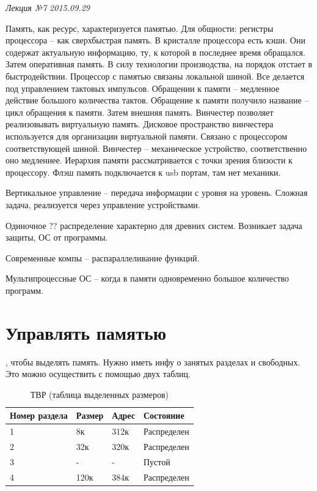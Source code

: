 \clearpage
\begin{flushright}
	\textit{Лекция №7}
	\textit{2015.09.29}
\end{flushright}

Память, как ресурс, характеризуется памятью. Для общности: регистры процессора – как сверхбыстрая память. В кристалле процессора есть кэши. Они содержат актуальную информацию, ту, к которой в последнее время обращался. Затем оперативная память. В силу технологии производства, на порядок отстает в быстродействии. Процессор с памятью связаны локальной шиной. Все делается под управлением тактовых импульсов. Обращении к памяти – медленное действие большого количества тактов. Обращение к памяти получило название – цикл обращения к памяти. Затем внешняя память. Винчестер позволяет реализовывать виртуальную память. Дисковое пространство винчестера используется для организации виртуальной памяти. Связано с процессором соответствующей шиной. Винчестер – механическое устройство, соответственно оно медленнее. Иерархия памяти рассматривается с точки зрения близости к процессору. Флэш память подключается к usb портам, там нет механики. 

Вертикальное управление – передача информации с уровня на уровень. Сложная задача, реализуется через управление устройствами.

Одиночное ?? распределение характерно для древних систем. Возникает задача защиты, ОС от программы.

Современные компы – распараллеливание функций.

Мультипроцессные ОС – когда в памяти одновременно большое количество программ.

\section{Управлять памятью}, чтобы выделять память. Нужно иметь инфу о занятых разделах и свободных. Это можно осуществить с помощью двух таблиц. 

\begin{table}[H]
\caption{ТВР (таблица выделенных размеров)}
\begin{tabular}{|l|l|l|l|}
Номер раздела & Размер & Адрес & Состояние \\
\hline
1 & 8к & 312к & Распределен \\ 
\hline
2 & 32к & 320к & Распределен \\
\hline
3 & - & - & Пустой \\
\hline
4 & 120к & 384к & Распределен\\
\hline
\end{tabular}
\end{table}

